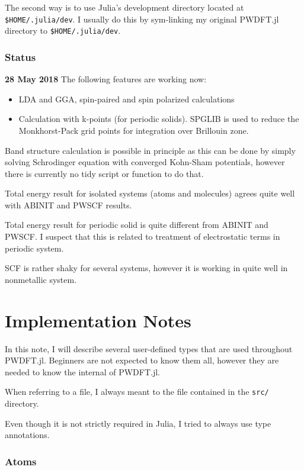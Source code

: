 \documentclass[a4paper,10pt]{paper}
\begin{document}
The second way is to use Julia's development directory located at
\texttt{\$HOME/.julia/dev}.
I usually do this by sym-linking my original \textsf{PWDFT.jl} directory
to \texttt{\$HOME/.julia/dev}.


\section{Status}

\textbf{28 May 2018} The following features are working now:
\begin{itemize}
\item LDA and GGA, spin-paired and spin polarized calculations
\item Calculation with k-points (for periodic solids).
  \textsf{SPGLIB} is used to reduce the Monkhorst-Pack grid points
  for integration over Brillouin zone.
\end{itemize}

Band structure calculation is possible in principle as this can be
done by simply solving
Schrodinger equation with converged Kohn-Sham potentials, however there
is currently no tidy script or function to do that.

Total energy result for isolated systems (atoms and molecules) agrees quite
well with ABINIT and PWSCF results.

Total energy result for periodic solid is quite different from ABINIT and PWSCF.
I suspect that this is related to treatment of electrostatic terms in periodic system.

SCF is rather shaky for several systems, however it is working in quite well in nonmetallic
system.

\part{Implementation Notes}

In this note, I will describe several user-defined types that are
used throughout \textsf{PWDFT.jl}. Beginners are not expected to know them
all, however they are needed to know the internal of \textsf{PWDFT.jl}.

When referring to a file, I always meant to the file contained in
the \texttt{src/} directory.

Even though it is not strictly required in Julia, I tried to always use type annotations.

\section{Atoms}
\end{document}

